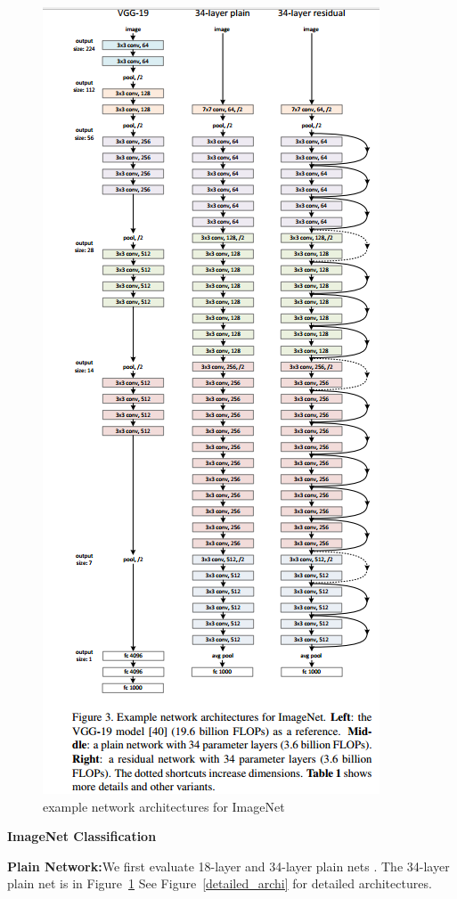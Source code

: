 \documentclass[11pt,en,bibstyle=ieeetr]{elegantpaper}
\begin{document}
\begin{figure}
	\centering
	\caption{example network architectures for ImageNet}
	\label{res_net_str}
	\includegraphics{fig/res_net_structure.png}
\end{figure}

\textbf{ImageNet Classification}

\textbf{Plain Network:}We first evaluate 18-layer and 34-layer plain nets . The 34-layer plain net is in Figure~\ref{res_net_str}
See Figure~\ref{detailed_archi} for detailed architectures.
\end{document}
